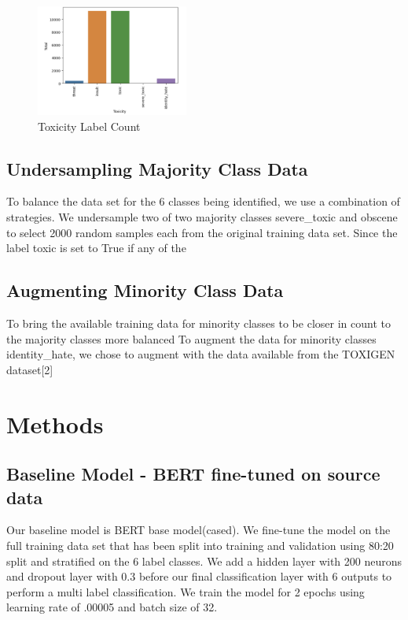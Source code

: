\documentclass[11pt,a4paper]{article}
\begin{document}
\begin{figure}[h!]
\centering
\includegraphics[width=50mm,scale=0.5]{label_counts.png}
\caption{Toxicity Label Count}
\label{Fig1. label count vs toxicity}
\end{figure}

\subsection{Undersampling Majority Class Data}
To balance the data set for the 6 classes being identified, we use a combination of strategies. We undersample two of two majority classes severe\_toxic and obscene to select 2000 random samples each from the original training data set. Since the label toxic is set to True if any of the 

\subsection{Augmenting Minority Class Data}
To bring the available training data for minority classes to be closer in count to the majority classes more balanced To augment the data for minority classes identity\_hate, we chose to augment with the data available from the TOXIGEN dataset[2]


\section{Methods}

\subsection{Baseline Model - BERT fine-tuned on source data}
Our baseline model is BERT base model(cased). We fine-tune the model on the full training data set that has been split into training and validation using 80:20 split and stratified on the 6 label classes. We add a hidden layer with 200 neurons and dropout layer with 0.3 before our final classification layer with 6 outputs to perform a multi label classification. We train the model for 2 epochs using learning rate of .00005 and batch size of 32.
\end{document}
